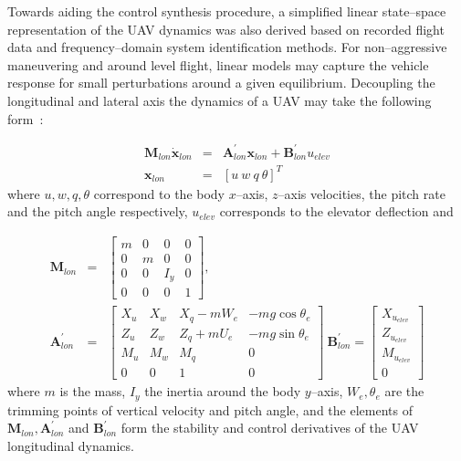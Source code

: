 
Towards aiding the control synthesis procedure, a simplified linear state--space representation of the UAV dynamics was also derived based on recorded flight data and frequency--domain system identification methods. For non--aggressive maneuvering and around level flight, linear models may capture the vehicle response for small perturbations around a given equilibrium. Decoupling the longitudinal and lateral axis the dynamics of a UAV may take the following form~\cite{dorobantu2011frequency,OMLAS_MED_2014}: 

\small
\begin{eqnarray}\label{LON_DYN}
 \mathbf{M}_{lon}\dot{\mathbf{x}}_{lon} &=& \mathbf{A}^\prime_{lon}\mathbf{x}_{lon}+\mathbf{B}^\prime_{lon}u_{elev} \\ \nonumber
 \mathbf{x}_{lon} &=& \left[ u~w~q~\theta \right]^T
\end{eqnarray}
\normalsize
where $u,w,q,\theta$ correspond to the body $x$--axis, $z$--axis velocities, the pitch rate and the pitch angle respectively, $u_{elev}$ corresponds to the elevator deflection and

\scriptsize
\begin{eqnarray}
\mathbf{M}_{lon} &=& \begin{bmatrix}
m & 0 & 0 & 0\\ 
0 & m & 0 & 0\\ 
0 & 0 & I_y & 0\\ 
0 & 0 & 0 & 1
\end{bmatrix},\\ \nonumber
\mathbf{A}^\prime_{lon} &=& \begin{bmatrix}
X_u & X_w & X_q-mW_e & -mg\cos\theta_e\\ 
Z_u & Z_w & Z_q+mU_e & -mg\sin\theta_e\\ 
M_u & M_w & M_q & 0 \\ 
0 & 0 & 1 & 0
\end{bmatrix}~
\mathbf{B}^\prime_{lon} = \begin{bmatrix}
X_{u_{elev}}\\ 
Z_{u_{elev}}\\ 
M_{u_{elev}}\\ 
0
\end{bmatrix}
\end{eqnarray}
\normalsize
where $m$ is the mass, $I_y$ the inertia around the body $y$--axis, $W_e,\theta_e$ are the trimming points of vertical velocity and pitch angle, and the elements of $\mathbf{M}_{lon},\mathbf{A}^\prime_{lon}$ and $\mathbf{B}^\prime_{lon}$ form the stability and control derivatives of the UAV longitudinal dynamics. 

